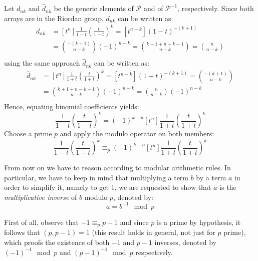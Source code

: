 Let $d_{nk}$ and $\hat{d}_{nk}$ be the generic elements of $\mathcal{P}$ and of
$\mathcal{P}^{-1}$, respectively. Since both arrays are in the Riordan group,
$d_{nk}$ can be written as:
\begin{displaymath}
    \begin{split}
        d_{nk} &= [t^n]\frac{1}{1-t}\left(\frac{t}{1-t}\right)^k = [t^{n-k}](1-t)^{-(k+1)} \\
            &= {{-(k+1)} \choose {n-k}}(-1)^{n-k} = {{k+1 +n-k -1} \choose {n-k}} = {{n} \choose {n-k}} \\
    \end{split}
\end{displaymath}
using the same approach $\hat{d}_{nk}$ can be written as:
\begin{displaymath}
  \begin{split}
    \hat{d}_{nk} &= [t^n]\frac{1}{1+t}\left(\frac{t}{1+t}\right)^k = [t^{n-k}](1+t)^{-(k+1)} = 
    {{-(k+1)} \choose {n-k}} \\
    &= {{k+1 +n-k -1} \choose {n-k}} (-1)^{n-k} = {{n} \choose {n-k}} (-1)^{n-k}\\
  \end{split}
\end{displaymath}
Hence, equating binomial coefficients yields:
\begin{displaymath}
  [t^n]\frac{1}{1-t}\left(\frac{t}{1-t}\right)^k = (-1)^{k-n}[t^n]\frac{1}{1+t}\left(\frac{t}{1+t}\right)^k 
\end{displaymath}
Choose a prime $p$ and apply the modulo operator on both members:
\begin{displaymath}
  [t^n]\frac{1}{1-t}\left(\frac{t}{1-t}\right)^k \equiv_{p} (-1)^{k-n}[t^n]\frac{1}{1+t}\left(\frac{t}{1+t}\right)^k 
\end{displaymath}

From now on we have 
to reason according to modular arithmetic rules. In particular, we have to keep in
mind that multiplying a term $b$ by a term $a$ in order to simplify it, namely
to get $1$, we are requested  to show that $a$ is the
\emph{multiplicative inverse} of $b$ modulo $p$, denoted by: 
\begin{displaymath}
    a = b^{-1}\mod p
\end{displaymath}

First of all, observe that $-1 \equiv_{p} p-1$ and since $p$ is a prime by
hypothesis, it follows that $(p, p-1)=1$ (this result holds in general, not
just for $p$ prime), which proofs the existence of both $-1$ and $p-1$
inverses, denoted by $(-1)^{-1}\mod p$ and $(p-1)^{-1}\mod p$ respectively.

